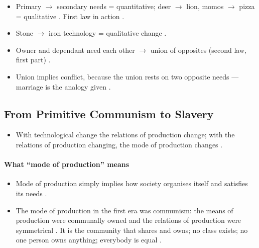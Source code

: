 \begin{QuickRevision}
\begin{itemize}
    \item Primary $\rightarrow$ secondary needs = quantitative; deer $\rightarrow$ lion, momos $\rightarrow$ pizza = qualitative . First law in action .
    \item Stone $\rightarrow$ iron technology = qualitative change .
    \item Owner and dependant need each other $\rightarrow$ union of opposites (second law, first part) .
    \item Union implies conflict, because the union rests on two opposite needs --- marriage is the analogy given .
\end{itemize}
\end{QuickRevision}

\subsection{From Primitive Communism to Slavery}
\begin{itemize}
    \item With technological change the relations of production change; with the relations of production changing, the mode of production changes .
\end{itemize}

\paragraph{What ``mode of production'' means}
\begin{itemize}
    \item Mode of production simply implies how society organises itself and satisfies its needs .
    \item The mode of production in the first era was communism: the means of production were communally owned and the relations of production were symmetrical . It is the community that shares and owns; no class exists; no one person owns anything; everybody is equal .
\end{itemize}

